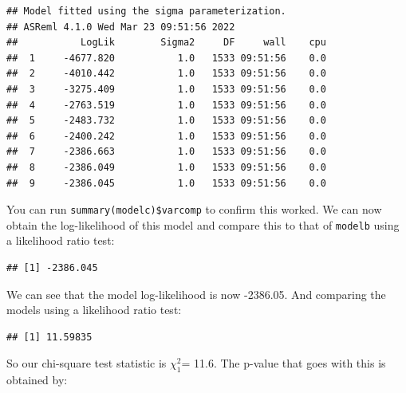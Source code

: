 \documentclass[
  12pt,
]{book}
\newenvironment{Shaded}{\begin{snugshade}}{\end{snugshade}}
\newcommand{\DecValTok}[1]{\textcolor[rgb]{0.00,0.00,0.81}{#1}}
\newcommand{\KeywordTok}[1]{\textcolor[rgb]{0.13,0.29,0.53}{\textbf{#1}}}
\newcommand{\NormalTok}[1]{#1}
\newcommand{\OperatorTok}[1]{\textcolor[rgb]{0.81,0.36,0.00}{\textbf{#1}}}
\newcommand{\StringTok}[1]{\textcolor[rgb]{0.31,0.60,0.02}{#1}}
\begin{document}
\begin{verbatim}
## Model fitted using the sigma parameterization.
## ASReml 4.1.0 Wed Mar 23 09:51:56 2022
##           LogLik        Sigma2     DF     wall    cpu
##  1     -4677.820           1.0   1533 09:51:56    0.0
##  2     -4010.442           1.0   1533 09:51:56    0.0
##  3     -3275.409           1.0   1533 09:51:56    0.0
##  4     -2763.519           1.0   1533 09:51:56    0.0
##  5     -2483.732           1.0   1533 09:51:56    0.0
##  6     -2400.242           1.0   1533 09:51:56    0.0
##  7     -2386.663           1.0   1533 09:51:56    0.0
##  8     -2386.049           1.0   1533 09:51:56    0.0
##  9     -2386.045           1.0   1533 09:51:56    0.0
\end{verbatim}

You can run \texttt{summary(modelc)\$varcomp} to confirm this worked. We can now obtain the log-likelihood of this model and compare this to that of \texttt{modelb} using a likelihood ratio test:

\begin{Shaded}
\end{Shaded}

\begin{verbatim}
## [1] -2386.045
\end{verbatim}

We can see that the model log-likelihood is now -2386.05.
And comparing the models using a likelihood ratio test:

\begin{Shaded}
\end{Shaded}

\begin{verbatim}
## [1] 11.59835
\end{verbatim}

So our chi-square test statistic is \(\chi^2_1\)= 11.6.
The p-value that goes with this is obtained by:

\begin{Shaded}
\end{Shaded}
\end{document}
